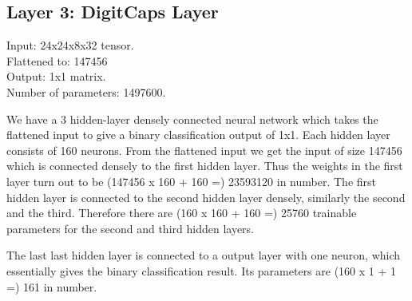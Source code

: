 
\subsection{Layer 3: DigitCaps Layer} %
\label{sub:layer_3_digitcaps_layer}
\noindent Input: 24x24x8x32 tensor.
\\Flattened to: 147456
\\Output: 1x1 matrix.
\\Number of parameters: 1497600.

\par\bigskip We have a 3 hidden-layer densely connected neural network which takes the flattened input to give a binary classification output of 1x1. Each hidden layer consists of 160 neurons. From the flattened input we get the input of size 147456 which is connected densely to the first hidden layer. Thus the weights in the first layer turn out to be (147456 x 160 + 160 =)  23593120 in number. The first hidden layer is connected to the second hidden layer densely, similarly the second and the third. Therefore there are (160 x 160 + 160 =) 25760 trainable parameters for the second and third hidden layers. 
\par\bigskip The last last hidden layer is connected to a output layer with one neuron, which essentially gives the binary classification result. Its parameters are (160 x 1 + 1 =) 161 in number. 




